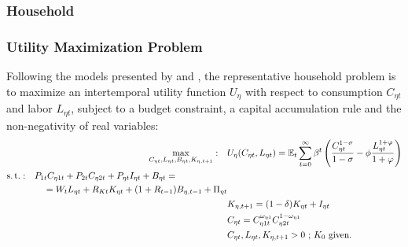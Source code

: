 \documentclass[
thesis.tex
]{subfiles}
\begin{document}
\newpage




\subsubsection{Household}

\subsubsection*{Utility Maximization Problem}

Following the models presented by \textcite{costa_junior_understanding_2016} and \textcite{solis-garcia_ucb_2022}, the representative household problem is to maximize an intertemporal utility function $U_{\eta}$ with respect to consumption $C_{\eta t}$ and labor $L_{\eta t}$, subject to a budget constraint, a capital accumulation rule and the non-negativity of real variables:
\begin{align}
	\max_{C_{\eta t}, L_{\eta t}, B_{\eta t}, K_{\eta, t+1}}: \quad & U_{\eta}(C_{\eta t},L_{\eta t}) = {\mathbb{E}_{t}} \sum_{t=0}^{\infty} \beta^t \left(\frac{C_{\eta t}^{1-\sigma}}{1-\sigma} - \phi \frac{L_{\eta t}^{1+\varphi}}{1+\varphi} \right) \label{eq:reg-utility-function-0} 
	\\
	\begin{split}
		\operatorname{s.t.}: \quad & P_{1 t} C_{\eta 1 t} + P_{2 t} C_{\eta 2 t} + P_{\eta t} I_{\eta t} + B_{\eta t} = \\ & \quad = W_t L_{\eta t} + R_{Kt} K_{\eta t} + (1 + R_{t-1}) B_{\eta,t-1} + \Pi_{\eta t}
	\end{split} \label{eq:reg-budget-constraint} \\
	\quad & K_{\eta, t+1} = (1-\delta)K_{\eta t} + I_{\eta t} \label{eq:reg-law-of-motion-for-capital} \\
	\quad & C_{\eta t} = C_{\eta 1 t}^{\omega_{\eta 1}} C_{\eta 2 t}^{1-\omega_{\eta 1}} \label{eq:reg-consumption-aggregation} \\
	\quad & C_{\eta t}, L_{\eta t}, K_{\eta, t+1} > 0 \text{ ; $K_0$ given.} \nonumber
\end{align}
\end{document}
